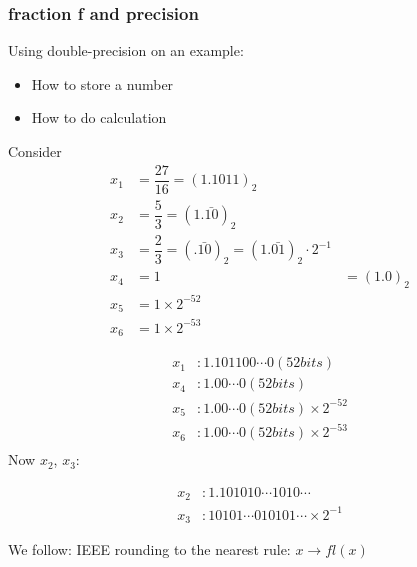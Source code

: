 \documentclass[10pt]{article}
\theoremstyle{definition}
\begin{document}
\begin{enumerate}
\subsubsection{fraction f and precision}

Using double-precision on an example: \begin{itemize}
\item How to store a number
\item How to do calculation
\end{itemize}

Consider \begin{align*}
x_1 &= \dfrac{27}{16} = (1.1011)_2\\
x_2&=\dfrac{5}{3} = (1.\bar{10})_2\\
x_3 &=\dfrac{2}{3} = (.\bar{10})_2 = (1.\bar{01})_2\cdot 2^{-1}\\
x_4 &=1 &=(1.0)_2\\
x_5 &=1\times 2^{-52}\\
x_6 &= 1\times 2^{-53}
\end{align*}

\begin{align*}
x_1 &: 1.\boxed{101100\cdots 0} (52 bits)\\
x_4 &: 1.\boxed{00\cdots 0} (52 bits)\\
x_5&: 1.\boxed{00\cdots 0} (52 bits)\times 2^{-52}\\
x_6&: 1.\boxed{00\cdots 0} (52 bits)\times 2^{-53}\\
\end{align*}
Now $x_2$, $x_3$:

\begin{align*}
x_2 &: 1.\boxed{101010\cdots 10}10\cdots\\
x_3&:1\boxed{0101\cdots 01}0101\cdots \times 2^{-1}
\end{align*}

We follow: IEEE rounding to the nearest rule:
$x\rightarrow fl(x) $
 \end{enumerate}
\end{document}
